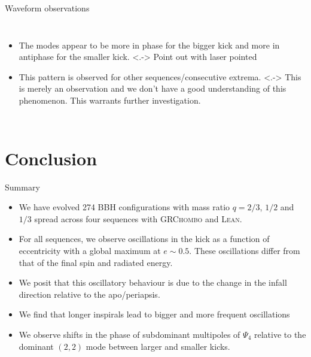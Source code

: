 \documentclass[smaller,aspectratio=169]{beamer}
\begin{document}
\begin{frame}{Waveform observations}
\begin{columns}
\begin{itemize}
				\item<+->
					The modes appear to be more \alert{in phase} for the 
					bigger kick 
					and more \alert{in antiphase} for the smaller kick.
                \note[item]<.->{
                    Point out with laser pointed}
				\item<+->
					This pattern is observed for other 
					sequences/consecutive extrema.
                \note[item]<.->{
                    This is merely an observation and we don't have a good
                    understanding of this phenomenon. This warrants further
                    investigation.}
			\end{itemize}
	\end{columns}
\end{frame}

\section{Conclusion}

\begin{frame}{Summary}
    \begin{itemize}
        \item<+->
            We have evolved 274 BBH configurations with mass ratio 
            $q=2/3$, $1/2$ and $1/3$ spread across four 
            sequences with \textsc{GRChombo} and \textsc{Lean}.
        \item<+->
            For all sequences, we observe \alert{oscillations} in the kick as a 
            function of eccentricity with
            a global maximum at $e\sim0.5$. These oscillations differ
            from that of the final spin and radiated energy.
        \item<+->
            We posit that this oscillatory behaviour is due to the change in the
            \alert{infall direction} relative to the \alert{apo/periapsis}. 
        \item<+->
            We find that longer inspirals lead to bigger and 
            more frequent oscillations
        \item<+->
            We observe shifts in the \alert{phase} of subdominant 
            multipoles of $\Psi_4$ relative to the dominant $(2,2)$ mode
            between larger and smaller kicks.
    \end{itemize}
\end{frame}
\end{document}
